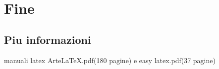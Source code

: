 \documentclass[openany,12pt,a4paper]{report}
\begin{document}
\chapter{Fine}
\section{Piu informazioni}
manuali latex ArteLaTeX.pdf(180 pagine) e easy latex.pdf(37 pagine)


\end{document}
